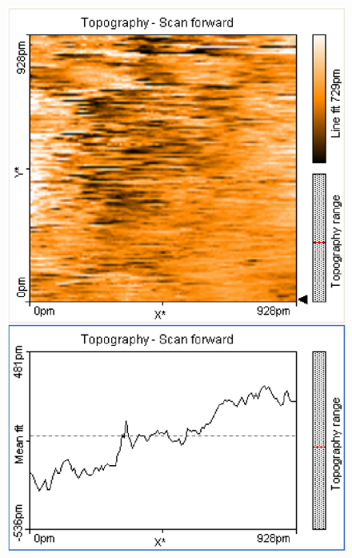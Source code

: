\documentclass[12pt]{article}
\begin{document}
\begin{figure}[H]
\begin{minipage}{0.4\linewidth}
\includegraphics[width=0.9\linewidth]{../plot/data/mos2/mos27.eps}
\end{minipage}
\end{figure}
\end{document}
